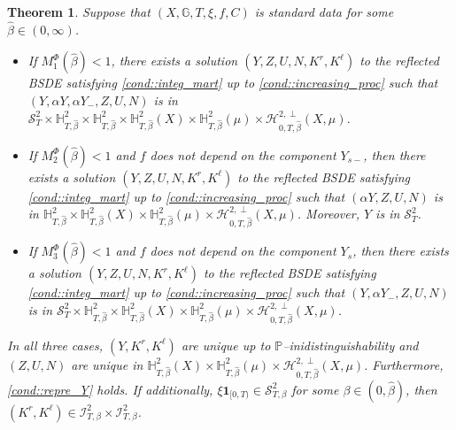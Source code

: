 \documentclass[10pt]{article} %
\newtheorem{theorem}{Theorem}[section]
\newcommand\cH{\mathcal H}
\newcommand\cI{\mathcal I}
\newcommand\cS{\mathcal S}
\def \G{\mathbb{G}}
\def \H{\mathbb{H}}
\def \P{\mathbb{P}}
\newcommand{\1}{\mathbf{1}}
\begin{document}
\begin{theorem}\label{thm::main}
	Suppose that $(X,\G,T,\xi,f,C)$ is standard data for some $\hat\beta \in (0,\infty)$.	
	\begin{itemize}
	\item[$(i)$] If $M_1^\Phi(\hat\beta) < 1$, there exists a solution $(Y,Z,U,N,K^r,K^\ell)$ to the reflected {\rm BSDE} satisfying \ref{cond::integ_mart} up to \ref{cond::increasing_proc} such that $(Y,\alpha Y,\alpha Y_-,Z,U,N)$ is in $\cS^2_T \times \H^2_{T,\hat\beta} \times \H^2_{T,\hat\beta} \times \H^2_{T,\hat\beta}(X) \times \H^2_{T,\hat\beta}(\mu) \times \cH^{2,\perp}_{0,T,\hat\beta}(X,\mu)$. 
	
	\item[$(ii)$] If $M_2^\Phi(\hat\beta) < 1$ and $f$ does not depend on the component $Y_{s-}$, then there exists a solution $(Y,Z,U,N,K^r,K^\ell)$ to the reflected {\rm BSDE} satisfying \ref{cond::integ_mart} up to \ref{cond::increasing_proc} such that $(\alpha Y,Z,U,N)$ is in $\H^2_{T,\hat\beta} \times \H^2_{T,\hat\beta}(X) \times \H^2_{T,\hat\beta}(\mu) \times \cH^{2,\perp}_{0,T,\hat\beta}(X,\mu)$. Moreover, $Y$ is in $\cS^2_T$.
	
	\item[$(iii)$] If $M_3^\Phi(\hat\beta) < 1$ and $f$ does not depend on the component $Y_s$, then there exists a solution $(Y,Z,U,N,K^r,K^\ell)$ to the reflected {\rm BSDE} satisfying \ref{cond::integ_mart} up to \ref{cond::increasing_proc} such that $(Y,\alpha Y_-,Z,U,N)$ is in $\cS^2_T \times \H^2_{T,\hat\beta} \times \H^2_{T,\hat\beta}(X) \times \H^2_{T,\hat\beta}(\mu) \times \cH^{2,\perp}_{0,T,\hat\beta}(X,\mu)$. 
	\end{itemize}
	In all three cases, $(Y,K^r,K^\ell)$ are unique up to $\P$--inidistinguishability and $(Z,U,N)$ are unique in $\H^2_{T,\hat\beta}(X) \times \H^2_{T,\hat\beta}(\mu) \times \cH^{2,\perp}_{0,T,\hat\beta}(X,\mu)$. Furthermore, \ref{cond::repre_Y} holds. 
	If additionally, $\xi\mathbf{1}_{[0,T)} \in \cS^2_{T,\beta}$ for some $\beta \in (0,\hat\beta)$, then $(K^r,K^\ell) \in \cI^2_{T,\beta} \times \cI^2_{T,\beta}$.
\end{theorem}
\end{document}
